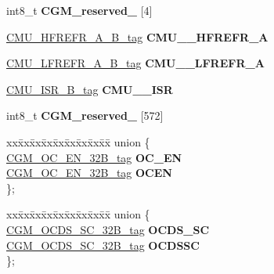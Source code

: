 \begin{DoxyCompactItemize}
\mbox{\label{structCGM__struct__tag_abf3175f39525ec255812cea180b82b38}} 
int8\+\_\+t {\bfseries C\+G\+M\+\_\+reserved\+\_} \mbox{[}4\mbox{]}
\item 
\mbox{\label{structCGM__struct__tag_a7ca9435c84b00959cfb8a94fa6e338c5}} 
\mbox{\hyperlink{unionCMU__HFREFR__A__32B__tag}{C\+M\+U\+\_\+\+H\+F\+R\+E\+F\+R\+\_\+\+A\+\_\+B\+\_\+tag}} {\bfseries C\+M\+U\+\_\+\_\+\+H\+F\+R\+E\+F\+R\+\_\+A}
\item 
\mbox{\label{structCGM__struct__tag_a7b25da7a8ff56b6bb21ee284037bdc3b}} 
\mbox{\hyperlink{unionCMU__LFREFR__A__32B__tag}{C\+M\+U\+\_\+\+L\+F\+R\+E\+F\+R\+\_\+\+A\+\_\+B\+\_\+tag}} {\bfseries C\+M\+U\+\_\+\_\+\+L\+F\+R\+E\+F\+R\+\_\+A}
\item 
\mbox{\label{structCGM__struct__tag_a44b0fc0fbffdd7f8e3d1fce29f4faab1}} 
\mbox{\hyperlink{unionCMU__ISR__32B__tag}{C\+M\+U\+\_\+\+I\+S\+R\+\_\+B\+\_\+tag}} {\bfseries C\+M\+U\+\_\+\_\+\+I\+SR}
\item 
\mbox{\label{structCGM__struct__tag_a9d7cb868ef09dec212fc31030dd06222}} 
int8\+\_\+t {\bfseries C\+G\+M\+\_\+reserved\+\_} \mbox{[}572\mbox{]}
\item 
\mbox{\label{structCGM__struct__tag_a53039b75a89af609a333bbf5fdab5b89}} 
\begin{tabbing}
xx\=xx\=xx\=xx\=xx\=xx\=xx\=xx\=xx\=\kill
union \{\\
\>\mbox{\hyperlink{unionCGM__OC__EN__32B__tag}{CGM\_OC\_EN\_32B\_tag}} {\bfseries OC\_EN}\\
\>\mbox{\hyperlink{unionCGM__OC__EN__32B__tag}{CGM\_OC\_EN\_32B\_tag}} {\bfseries OCEN}\\
\}; \\

\end{tabbing}\item 
\mbox{\label{structCGM__struct__tag_a233d9340457554a48ed2c729ca30e735}} 
\begin{tabbing}
xx\=xx\=xx\=xx\=xx\=xx\=xx\=xx\=xx\=\kill
union \{\\
\>\mbox{\hyperlink{unionCGM__OCDS__SC__32B__tag}{CGM\_OCDS\_SC\_32B\_tag}} {\bfseries OCDS\_SC}\\
\>\mbox{\hyperlink{unionCGM__OCDS__SC__32B__tag}{CGM\_OCDS\_SC\_32B\_tag}} {\bfseries OCDSSC}\\
\}; \\


\end{tabbing}
\end{DoxyCompactItemize}
